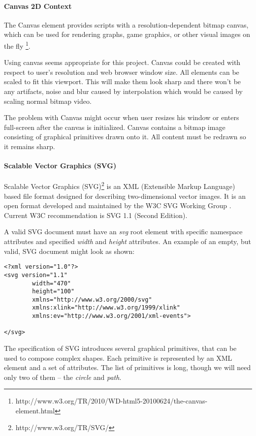 \paragraph{Canvas 2D Context}
The Canvas element provides scripts with a resolution-dependent bitmap canvas, which can be used for rendering graphs, game graphics, or other visual images on the fly \cite{} \footnote{http://www.w3.org/TR/2010/WD-html5-20100624/the-canvas-element.html}. 

Using canvas seems appropriate for this project. Canvas could be created with respect to user's resolution and web browser window size. All elements can be scaled to fit this viewport. This will make them look sharp and there won't be any artifacts, noise and blur caused by interpolation which would be caused by scaling normal bitmap video.

The problem with Canvas might occur when user resizes his window or enters full-screen after the canvas is initialized. Canvas contains a bitmap image consisting of graphical primitives drawn onto it. All content must be redrawn so it remains sharp.

\paragraph{Scalable Vector Graphics (SVG)}
Scalable Vector Graphics (SVG)\footnote{http://www.w3.org/TR/SVG/} is an XML (Extensible Markup Language) based file format designed for describing two-dimensional vector images. It is an open format developed and maintained by the W3C SVG Working Group \cite{} . Current W3C recommendation is SVG 1.1 (Second Edition).

A valid SVG document must have an \textit{svg} root element with specific namespace attributes and specified \textit{width} and \textit{height} attributes. An example of an empty, but valid, SVG document might look as shown:

\begin{verbatim}
<?xml version="1.0"?>
<svg version="1.1"
        width="470"
        height="100"
        xmlns="http://www.w3.org/2000/svg"
        xmlns:xlink="http://www.w3.org/1999/xlink"
        xmlns:ev="http://www.w3.org/2001/xml-events">

</svg>

\end{verbatim}

The specification of SVG introduces several graphical primitives, that can be used to compose complex shapes. Each primitive is represented by an XML element and a set of attributes. The list of primitives is long, though we will need only two of them -- the \textit{circle} and \textit{path}.

